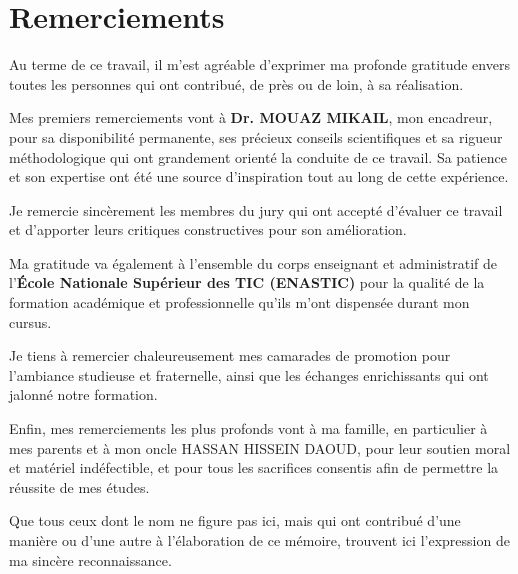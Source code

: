 
\chapter*{Remerciements}
\thispagestyle{plain}

Au terme de ce travail, il m'est agréable d'exprimer ma profonde
gratitude envers toutes les personnes qui ont contribué, de près
ou de loin, à sa réalisation.

\medskip

Mes premiers remerciements vont à \textbf{Dr. MOUAZ MIKAIL},
mon encadreur, pour sa disponibilité permanente, ses précieux
conseils scientifiques et sa rigueur méthodologique qui ont
grandement orienté la conduite de ce travail. Sa patience et
son expertise ont été une source d'inspiration tout au long de
cette expérience.

\medskip

Je remercie sincèrement les membres du jury qui ont accepté
d'évaluer ce travail et d'apporter leurs critiques constructives
pour son amélioration.

\medskip

Ma gratitude va également à l'ensemble du corps enseignant et
administratif de l'\textbf{École Nationale Supérieur des TIC (ENASTIC)} pour la qualité de
la formation académique et professionnelle qu'ils m'ont dispensée
durant mon cursus.

\medskip

Je tiens à remercier chaleureusement mes camarades de promotion
pour l'ambiance studieuse et fraternelle, ainsi que les échanges
enrichissants qui ont jalonné notre formation.

\medskip

Enfin, mes remerciements les plus profonds vont à ma famille,
en particulier à mes parents et à mon oncle HASSAN HISSEIN DAOUD, pour leur soutien moral et matériel
indéfectible, et pour tous les sacrifices consentis afin de
permettre la réussite de mes études.

\medskip

Que tous ceux dont le nom ne figure pas ici, mais qui ont
contribué d'une manière ou d'une autre à l'élaboration de
ce mémoire, trouvent ici l'expression de ma sincère
reconnaissance.
